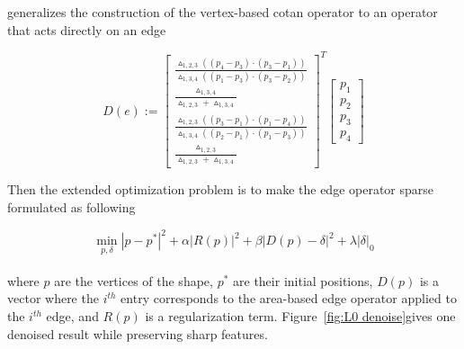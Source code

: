 \cite{he2013mesh} generalizes the construction of the vertex-based cotan operator to an operator that acts directly on an edge

\small{
\begin{equation}
 \label{eq:edgecotanoperator}
 D(e) := {\left[ \begin{array}{c}
 \frac{\vartriangle_{1,2,3}((p_4-p_3)\cdot(p_3-p_1))}{\vartriangle_{1,3,4}((p_1-p_3)\cdot(p_3-p_2))} \\
 \frac{\vartriangle_{1,3,4}}{\vartriangle_{1,2,3}+\vartriangle_{1,3,4}} \\
 \frac{\vartriangle_{1,2,3}((p_3-p_1)\cdot(p_1-p_4))}{\vartriangle_{1,3,4}((p_2-p_1)\cdot(p_1-p_3))} \\
 \frac{\vartriangle_{1,2,3}}{\vartriangle_{1,2,3}+\vartriangle_{1,3,4}}
 \end{array}
 \right]}^{T}
 \left[ \begin{array}{c}
 p_1 \\ p_2 \\ p_3 \\ p_4
 \end{array}
 \right]
\end{equation}
}

Then the extended optimization problem is to make the edge operator sparse formulated as following

\small{
\begin{equation}
 \label{eq:L0 denoise}
 \min_{p,\delta}|p-p^{*}|^2+\alpha|R(p)|^2+\beta|D(p)-\delta|^2+\lambda|\delta|_0
\end{equation}
}
\\
where $p$ are the vertices of the shape, $p^{*}$ are their initial positions, $D(p)$ is a vector where the $i^{th}$ entry corresponds to the area-based edge operator applied to the $i^{th}$ edge, and $R(p)$ is a regularization term. Figure~\ref{fig:L0 denoise}gives one denoised result while preserving sharp features.

